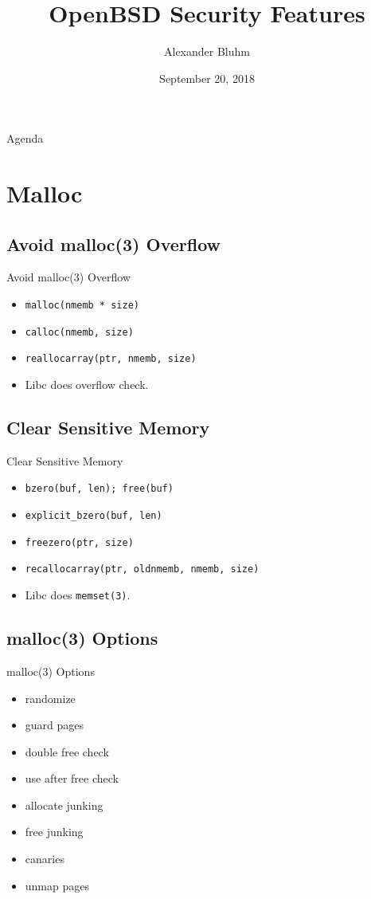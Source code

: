 \documentclass[14pt]{beamer}
\author{Alexander Bluhm}
\title{OpenBSD Security Features}
\institute{genua GmbH\\ \url{bluhm@genua.de}\\ \url{bluhm@openbsd.org}}
\date{September 20, 2018}
\begin{document}
\begin{frame}
\titlepage
\end{frame}

\begin{frame}{Agenda}
\setcounter{tocdepth}{1}
\tableofcontents
\end{frame}

\section{Malloc}

\subsection{Avoid malloc(3) Overflow}
\begin{frame}{Avoid malloc(3) Overflow}
\begin{itemize}
    \item \texttt{malloc(nmemb * size)}
    \item \texttt{calloc(nmemb, size)}
    \item \texttt{reallocarray(ptr, nmemb, size)}
    \item Libc does overflow check.
\end{itemize}
\end{frame}

\subsection{Clear Sensitive Memory}
\begin{frame}{Clear Sensitive Memory}
\begin{itemize}
    \item \texttt{bzero(buf, len); free(buf)}
    \item \texttt{explicit\_bzero(buf, len)}
    \item \texttt{freezero(ptr, size)}
    \item \texttt{recallocarray(ptr, oldnmemb, nmemb, size)}
    \item Libc does \texttt{memset(3)}.
\end{itemize}
\end{frame}

\subsection{malloc(3) Options}
\begin{frame}{malloc(3) Options}
\begin{itemize}
    \item randomize
    \item guard pages
    \item double free check
    \item use after free check
    \item allocate junking
    \item free junking
    \item canaries
    \item unmap pages
\end{itemize}
\end{frame}
\end{document}
